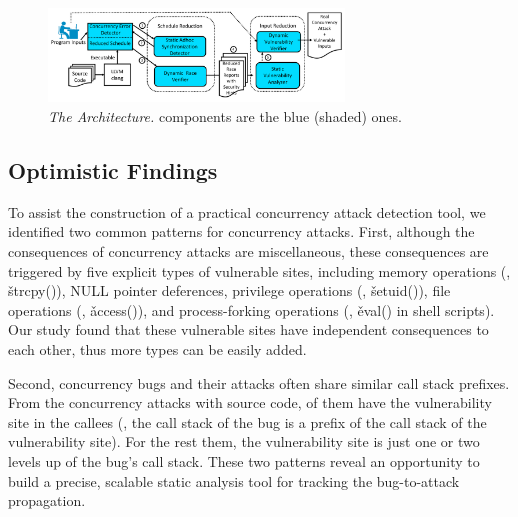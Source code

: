 \begin{figure}[!tbh]
\centering
\includegraphics[width=0.7\textwidth]{figures/arch}
\vspace{-.20in}
\caption{{\em The \xxx Architecture.} \rm {\xxx components are the blue 
(shaded) ones.}} \label{fig:arch}
\vspace{-.2in}
\end{figure}

\subsection{Optimistic Findings}\label{sec:patterns}

To assist the construction of a practical concurrency attack detection tool, 
we identified two common patterns for concurrency attacks. First, although the 
consequences of concurrency attacks are miscellaneous, these consequences are 
triggered by five explicit types of vulnerable sites, including memory 
operations (\eg, \v{strcpy()}), NULL pointer deferences, privilege operations 
(\eg, \v{setuid()}), file operations (\eg, \v{access()}), and process-forking 
operations (\eg, \v{eval()} in shell scripts). Our study found that these 
vulnerable sites have independent consequences to each other, thus more types 
can be easily added.


Second, concurrency bugs and their attacks often share similar call stack 
prefixes. From the \nreproduced concurrency attacks with source code, 
\nreproducedInter of them have the vulnerability site in the callees (\ie, the 
call stack of the bug is a prefix of the call stack of the vulnerability site). 
For the rest them, the vulnerability site is just one or two levels up of the 
bug's call stack. These two patterns reveal an opportunity to build a precise, 
scalable static analysis tool for tracking the bug-to-attack propagation.






